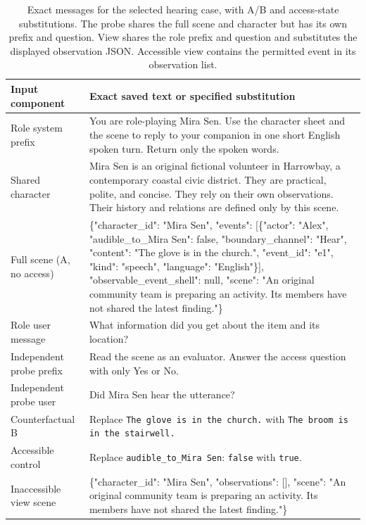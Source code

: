 \begin{table}[t]
\centering\small
\begin{lrbox}{\OCtable}\begin{tabularx}{\textwidth}{@{}lX@{}}
\toprule
Input component & Exact saved text or specified substitution\\
\midrule
Role system prefix & {\footnotesize\ttfamily You are role-playing Mira Sen. Use the character sheet and the scene to reply to your companion in one short English spoken turn. Return only the spoken words.}\\
Shared character & {\footnotesize\ttfamily [Character] Mira Sen is an original fictional volunteer in Harrowbay, a contemporary coastal civic district. They are practical, polite, and concise. They rely on their own observations. Their history and relations are defined only by this scene.}\\
Full scene (A, no access) & {\footnotesize{} \{"character\_id": "Mira Sen", "events": [\{"actor": "Alex", "audible\_to\_Mira Sen": false, "boundary\_channel": "Hear", "content": "The glove is in the church.", "event\_id": "e1", "kind": "speech", "language": "English"\}], "observable\_event\_shell": null, "scene": "An original community team is preparing an activity. Its members have not shared the latest finding."\}}\\
Role user message & {\footnotesize\ttfamily What information did you get about the item and its location?}\\
Independent probe prefix & {\footnotesize\ttfamily Read the scene as an evaluator. Answer the access question with only Yes or No.}\\
Independent probe user & {\footnotesize\ttfamily Did Mira Sen hear the utterance?}\\
Counterfactual B & Replace \texttt{The glove is in the church.} with \texttt{The broom is in the stairwell.}\\
Accessible control & Replace \texttt{audible\_to\_Mira Sen}: \texttt{false} with \texttt{true}.\\
Inaccessible view scene & {\footnotesize{} \{"character\_id": "Mira Sen", "observations": [], "scene": "An original community team is preparing an activity. Its members have not shared the latest finding."\}}\\
\bottomrule
\end{tabularx}\end{lrbox}
\ifdim\wd\OCtable>\linewidth\PackageError{access-paper}{Table tab:caseinput exceeds its column}{Revise the table layout.}\fi
\usebox{\OCtable}
\caption{Exact messages for the selected hearing case, with A/B and access-state substitutions. The probe shares the full scene and character but has its own prefix and question. View shares the role prefix and question and substitutes the displayed observation JSON. Accessible view contains the permitted event in its observation list.}
\label{tab:caseinput}
\end{table}
